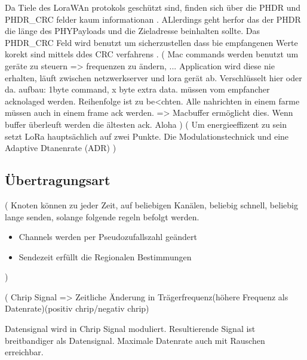 \documentclass[a4paper,12pt]{article}
\begin{document}
            Da Tiele des LoraWAn protokols geschützt sind, finden sich über die PHDR und PHDR\_CRC felder kaum informationan . ALlerdings geht herfor das der PHDR die länge des PHYPayloads und die Zieladresse beinhalten sollte. 
            Das PHDR\_CRC Feld wird benutzt um sicherzustellen dass bie empfangenen Werte korekt sind mittels ddes CRC verfahrens .
            \cite{LoRaSpec}(
                Mac commands werden benutzt um geräte zu steuern => frequenzen zu ändern, ...
                Application wird diese nie erhalten, läuft zwischen netzwerkserver und lora gerät ab.
                Verschlüsselt hier oder da.
                aufbau: 1byte command, x byte extra data.
                müssen vom empfancher acknolaged werden. Reihenfolge ist zu be<chten. Alle nahrichten in einem farme müssen auch in einem frame ack werden. => Macbuffer ermöglicht dies. Wenn buffer überleuft werden die ältesten ack. 
                Aloha
            )
            \cite{LoraClasses}(
                Um energieeffizent zu sein setzt LoRa hauptsächlich auf zwei Punkte. Die Modulationstechnick und eine Adaptive Dtanenrate (ADR)
            )
        \subsection{Übertragungsart}\label{sec:Modulation}
            \cite{LoRaSpec}(
                Knoten können zu jeder Zeit, auf beliebigen Kanälen, beliebig schnell, beliebig lange senden, solange folgende regeln befolgt werden.
                \begin{itemize}
                    
                        \item Channels werden per Pseudozufallszahl geändert
                        \item Sendezeit erfüllt die Regionalen Bestimmungen
                    
                \end{itemize}
            )

            \cite{LoraLimit}(
                Chrip Signal => Zeitliche Änderung in Trägerfrequenz(höhere Frequenz als Datenrate)(positiv chrip/negativ chrip)

                Datensignal wird in Chrip Signal moduliert. Resultierende Signal ist breitbandiger als Datensignal. Maximale Datenrate auch mit Rauschen erreichbar.
\end{document}
